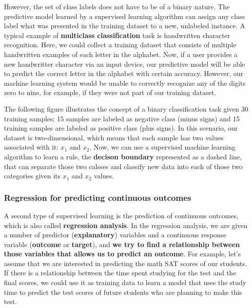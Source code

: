 \documentclass[11pt]{article}
\begin{document}
    However, the set of class labels does not have to be of a binary nature.
The predictive model learned by a supervised learning algorithm can
assign any class label what was presented in the training dataset to a
new, unlabeled instance. A typical example of \textbf{multiclass
classification} task is handwritten character recognition. Here, we
could collect a training dataset that consists of multiple handwritten
examples of each letter in the alphabet. Now, if a user provides a new
handwritter character via an input device, our predictive model will be
able to predict the correct letter in the alphabet with certain
accuracy. However, our machine learning system would be unable to
correctly recognize any of the digits zero to nine, for example, if they
were not part of our training dataset.

    The following figure illustrates the concept of a binary classification
task given 30 training samples; 15 samples are labeled as negative class
(minus signs) and 15 training samples are labeled as positive class
(plus signs). In this scenario, our dataset is two-dimensional, which
means that each sample has two values associated with it: \(x_1\) and
\(x_2\). Now, we can use a supervised machine learning algorithm to
learn a rule, the \textbf{decison boundary} represented as a dashed
line, that can separate those two calsses and classify new data into
each of those two categories given its \(x_1\) and \(x_2\) values.

    

    \subsubsection{Regression for predicting continuous
outcomes}\label{regression-for-predicting-continuous-outcomes}

    A second type of supervised learning is the prediction of continuous
outcomes, which is also called \textbf{regression analysis}. In the
regression analysis, we are given a number of predictor
(\textbf{explanatory}) variables and a continuous response variable
(\textbf{outcome} or \textbf{target}), and \textbf{we try to find a
relationship between those variables that allows us to predict an
outcome}. For example, let's assume that we are interested in predicting
the math SAT scores of our students. If there is a relationship between
the time spent studying for the test and the final scores, we could use
it as training data to learn a model that uses the study time to predict
the test scores of future students who are planning to make this test.
\end{document}
